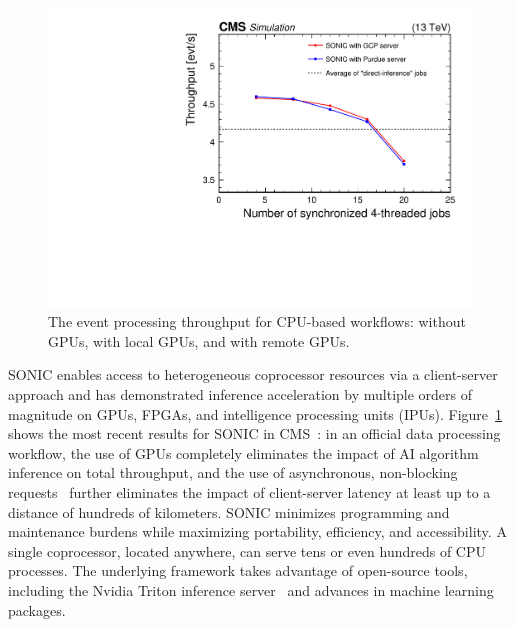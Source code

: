\begin{figure}
\centering
\includegraphics[width=0.49\myfigurewidth]{figures/MLG-23-001_Figure_009.pdf}
\caption{The event processing throughput for CPU-based workflows: without GPUs, with local GPUs, and with remote GPUs.}
\label{fig:sonic}
\end{figure}

SONIC enables access to heterogeneous coprocessor resources via a client-server approach
and has demonstrated inference acceleration by multiple orders of magnitude on GPUs, FPGAs, and intelligence processing units (IPUs).
Figure~\ref{fig:sonic} shows the most recent results for SONIC in CMS~\cite{CMS:2024twn}:
in an official data processing workflow, the use of GPUs completely eliminates the impact of AI algorithm inference on total throughput,
and the use of asynchronous, non-blocking requests~\cite{Bocci:2020olh} further eliminates the impact of client-server latency at least up to a distance of hundreds of kilometers.
SONIC minimizes programming and maintenance burdens while maximizing portability, efficiency, and accessibility.
A single coprocessor, located anywhere, can serve tens or even hundreds of CPU processes.
The underlying framework takes advantage of open-source tools, including the Nvidia Triton inference server~\cite{nvidia} and advances in machine learning packages.

